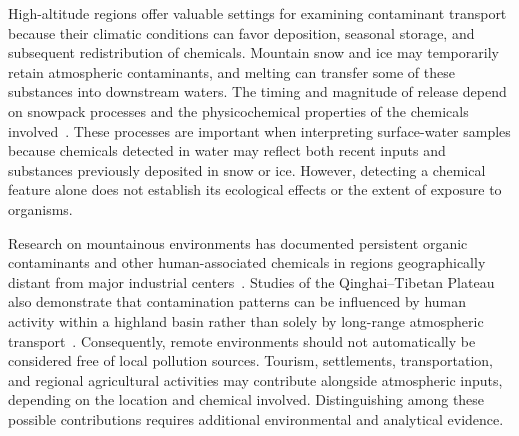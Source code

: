 
        High-altitude regions offer valuable settings for examining contaminant transport because their climatic conditions can favor deposition, seasonal storage, and subsequent redistribution of chemicals. Mountain snow and ice may temporarily retain atmospheric contaminants, and melting can transfer some of these substances into downstream waters. The timing and magnitude of release depend on snowpack processes and the physicochemical properties of the chemicals involved~\cite{Herbert2006,Meyer2008}. These processes are important when interpreting surface-water samples because chemicals detected in water may reflect both recent inputs and substances previously deposited in snow or ice. However, detecting a chemical feature alone does not establish its ecological effects or the extent of exposure to organisms.

        Research on mountainous environments has documented persistent organic contaminants and other human-associated chemicals in regions geographically distant from major industrial centers~\cite{Daly2005,Xu2011,WangCong2019}. Studies of the Qinghai--Tibetan Plateau also demonstrate that contamination patterns can be influenced by human activity within a highland basin rather than solely by long-range atmospheric transport~\cite{Ma2025}. Consequently, remote environments should not automatically be considered free of local pollution sources. Tourism, settlements, transportation, and regional agricultural activities may contribute alongside atmospheric inputs, depending on the location and chemical involved. Distinguishing among these possible contributions requires additional environmental and analytical evidence.

